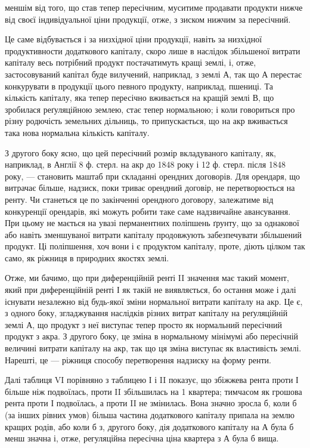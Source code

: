 \parcont{}  %
меншім від того, що став тепер пересічним, муситиме продавати продукти
нижче від своєї індивідуальної ціни продукції, отже, з зиском нижчим за
пересічний.

Це саме відбувається і за низхідної ціни продукції, навіть за низхідної продуктивности
додаткового капіталу, скоро лише в наслідок збільшеної витрати капіталу
весь потрібний продукт постачатимуть кращі землі, і, отже, застосовуваний капітал
буде вилучений, наприклад, з землі А, так що А перестає конкурувати в продукції
цього певного продукту, наприклад, пшениці. Та кількість капіталу, яка
тепер пересічно вживається на кращій землі В, що зробилася реґуляційною
землею, стає тепер нормальною; і коли говориться про різну родючість земельних
дільниць, то припускається, що на акр вживається така нова нормальна
кількість капіталу.

З другого боку ясно, що цей пересічний розмір вкладуваного капіталу, як,
наприклад, в Англії 8 ф. стерл. на акр до 1848 року і 12 ф. стерл. після 1848 року, —
становить маштаб при складанні орендних договорів. Для орендаря, що витрачає
більше, надзиск, поки триває орендний договір, не перетворюється на ренту. Чи
станеться це по закінченні орендного договору, залежатиме від конкуренції орендарів,
які можуть робити таке саме надзвичайне авансування. При цьому не мається
на увазі перманентних поліпшень ґрунту, що за однакової або навіть зменшуваної
витрати капіталу продовжують забезпечувати збільшений продукт. Ці поліпшення,
хоч вони і є продуктом капіталу, проте, діють цілком так само, як
ріжниця в природних якостях землі.

Отже, ми бачимо, що при диференційній ренті II значення має такий момент,
який при диференційній ренті І як такій не виявляється, бо остання може
і далі існувати незалежно від будь-якої зміни нормальної витрати капіталу
на акр. Це є, з одного боку, згладжування наслідків різних витрат капіталу
на реґуляційній землі А, що продукт з неї виступає тепер просто як нормальний
пересічний продукт з акра. З другого боку, це зміна в нормальному мінімумі
або пересічній величині витрати капіталу на акр, так що ця зміна виступає як
властивість землі. Нарешті, це — ріжниця способу перетворення надзиску на форму
ренти.

Далі таблиця VI порівняно з таблицею І і II показує, що збіжжева рента
проти І більше ніж подвоїлась, проти II збільшилась на 1  квартера; тимчасом
як грошова рента проти І подвоїлась, а проти II не змінилась. Вона значно
зросла б, коли б (за інших рівних умов) більша частина додаткового капіталу
припала на землю кращих родів, або коли б з, другого боку, дія додаткового
капіталу на А була б менш значна і, отже, регуляційна пересічна ціна квартера
з А була б вища.

